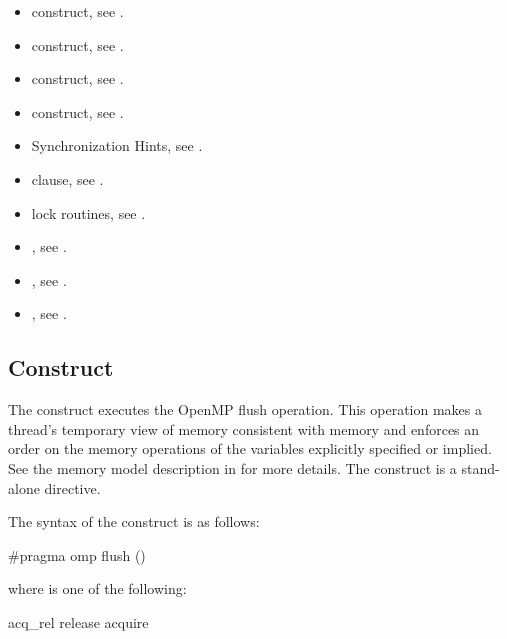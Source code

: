 \crossreferences
\begin{itemize}
\item {} construct, see
.

\item {} construct, see
.

\item {} construct, see
.

\item {} construct, see
.

\item Synchronization Hints, see
.

\item {} clause, see
.

\item lock routines, see .

\item {}, see
.

\item {}, see
.

\item {}, see
.

\end{itemize}



\subsection{ Construct}
\label{subsec:flush Construct}
\summary
The  construct executes the OpenMP flush operation. This operation makes a
thread's temporary view of memory consistent with memory and enforces an order on
the memory operations of the variables explicitly specified or implied. See the memory
model description in  for more details. The  
construct is a stand-alone directive.

\syntax
\begin{ccppspecific}
The syntax of the  construct is as follows:

\begin{ompcPragma}
#pragma omp flush  \plc{[}()\plc{] new-line}
\end{ompcPragma}
\begin{samepage}
where  is one of the following:

\begin{indentedcodelist}
acq_rel
release
acquire
\end{indentedcodelist}
\end{samepage}
\end{ccppspecific}

